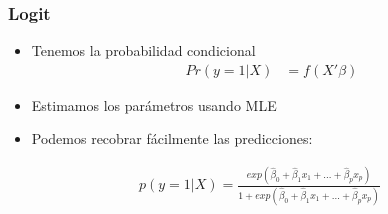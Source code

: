 \documentclass[
  shownotes,
  xcolor={svgnames},
  hyperref={colorlinks,citecolor=DarkBlue,linkcolor=DarkRed,urlcolor=DarkBlue}
  , aspectratio=169]{beamer}
\begin{document}
\begin{frame}[fragile]
\frametitle{Logit}
  \begin{itemize}


    \item Tenemos la probabilidad condicional
    \begin{align}
    Pr(y=1|X) &= f(X'\beta) 
    \end{align}
    \item Estimamos los parámetros usando MLE
    \medskip
    \item Podemos recobrar fácilmente las predicciones:
  \end{itemize}


\begin{align}
p(y=1|X)=\frac{exp(\hat{\beta}_0 +\hat{\beta}_1 x_1 + \dots +\hat{\beta}_p x_p)}{1+exp(\hat{\beta}_0 +\hat{\beta}_1 x_1 + \dots +\hat{\beta}_p x_p)}
\end{align}

\end{frame}
\end{document}
